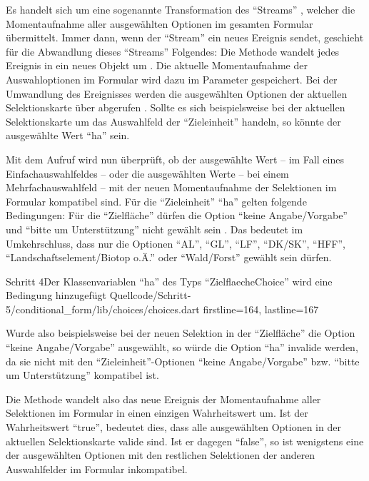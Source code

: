 Es handelt sich um eine sogenannte Transformation des \enquote{Streams} , welcher die Momentaufnahme aller ausgewählten Optionen im gesamten Formular übermittelt.
Immer dann, wenn der \enquote{Stream}  ein neues Ereignis sendet,
geschieht für die Abwandlung dieses \enquote{Streams} Folgendes:
Die Methode  wandelt jedes Ereignis in ein neues Objekt um .
Die aktuelle Momentaufnahme der Auswahloptionen im Formular wird dazu im Parameter  gespeichert.
Bei der Umwandlung des Ereignisses werden die ausgewählten Optionen der aktuellen Selektionskarte über  abgerufen .
Sollte es sich beispielsweise bei der aktuellen Selektionskarte um das Auswahlfeld der \enquote{Zieleinheit} handeln,
so könnte der ausgewählte Wert \enquote{ha} sein.

Mit dem Aufruf  wird nun überprüft, ob der ausgewählte Wert
-- im Fall eines Einfachauswahlfeldes --
oder die ausgewählten Werte
-- bei einem Mehrfachauswahlfeld --
mit der neuen Momentaufnahme der Selektionen im Formular kompatibel sind.
Für die \enquote{Zieleinheit} \enquote{ha} gelten folgende Bedingungen:
Für die \enquote{Zielfläche} dürfen die Option \enquote{keine Angabe/Vorgabe} und
\enquote{bitte um Unterstützung} nicht gewählt sein .
Das bedeutet im Umkehrschluss,
dass nur die Optionen \enquote{AL},
\enquote{GL},
\enquote{LF},
\enquote{DK/SK},
\enquote{HFF},
\enquote{Landschaftselement/Biotop o.Ä.} 
oder \enquote{Wald/Forst} gewählt sein dürfen. 

\begin{alexlisting}{Schritt 4}{Der Klassenvariablen \enquote{ha} des Typs \enquote{ZielflaecheChoice} wird eine Bedingung hinzugefügt}
  {Quellcode/Schritt-5/conditional_form/lib/choices/choices.dart}
  {firstline=164, lastline=167}
  \label{lst:Schritt5ha}
\end{alexlisting}

Wurde also beispielsweise bei der neuen Selektion in der \enquote{Zielfläche} die Option \enquote{keine Angabe/Vorgabe} ausgewählt,
so würde die Option \enquote{ha} invalide werden,
da sie nicht mit den \enquote{Zieleinheit}-Optionen \enquote{keine Angabe/Vorgabe} bzw. \enquote{bitte um Unterstützung}  kompatibel ist.

Die Methode   wandelt also das neue Ereignis der Momentaufnahme aller Selektionen im Formular in einen einzigen Wahrheitswert um.
Ist der Wahrheitswert \enquote{true},
bedeutet dies,
dass alle ausgewählten Optionen in der aktuellen Selektionskarte valide sind.
Ist er dagegen \enquote{false}, so ist wenigstens eine der ausgewählten Optionen mit den restlichen Selektionen der anderen Auswahlfelder im Formular inkompatibel.



